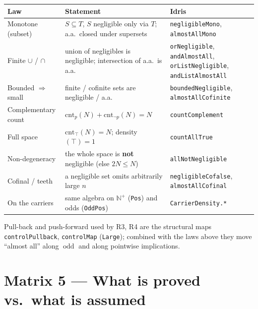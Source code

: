 \documentclass[10pt]{article}
\newcommand{\N}{\mathbb{N}}
\newcommand{\odd}{\operatorname{odd}}
\newcommand{\code}[1]{\texttt{\small #1}}
\begin{document}
\renewcommand{\arraystretch}{1.4}
\begin{longtable}{L{5.3cm} L{6.2cm} L{3.5cm}}
\toprule
\textbf{Law} & \textbf{Statement} & \textbf{Idris} \\
\midrule
\endhead
Monotone (subset) & $S\subseteq T$, $S$ negligible only via $T$; a.a.\ closed under supersets &
 \code{negligibleMono}, \code{almostAllMono} \\
Finite $\cup$ / $\cap$ & union of negligibles is negligible; intersection of a.a.\ is a.a. &
 \code{orNegligible}, \code{andAlmostAll}, \code{orListNegligible}, \code{andListAlmostAll} \\
Bounded $\Rightarrow$ small & finite / cofinite sets are negligible / a.a. &
 \code{boundedNegligible}, \code{almostAllCofinite} \\
Complementary count & $\mathrm{cnt}_p(N)+\mathrm{cnt}_{\lnot p}(N)=N$ &
 \code{countComplement} \\
Full space & $\mathrm{cnt}_{\top}(N)=N$; \; density$(\top)=1$ &
 \code{countAllTrue} \\
 Non-degeneracy & the whole space is \textbf{not} negligible (else $2N\le N$) &
 \code{allNotNegligible} \\
Cofinal / teeth & a negligible set omits arbitrarily large $n$ &
 \code{negligibleCofalse}, \code{almostAllCofinal} \\
On the carriers & same algebra on $\N^{+}$ (\code{Pos}) and odds (\code{OddPos}) &
 \code{CarrierDensity.*} \\
\bottomrule
\end{longtable}

\noindent
Pull-back and push-forward used by R3, R4 are the structural maps
\code{controlPullback}, \code{controlMap} (\code{Large}); combined with the laws
above they move ``almost all'' along $\odd$ and along pointwise implications.

\section*{Matrix 5 \; --- \; What is proved vs.\ what is assumed}
\end{document}

